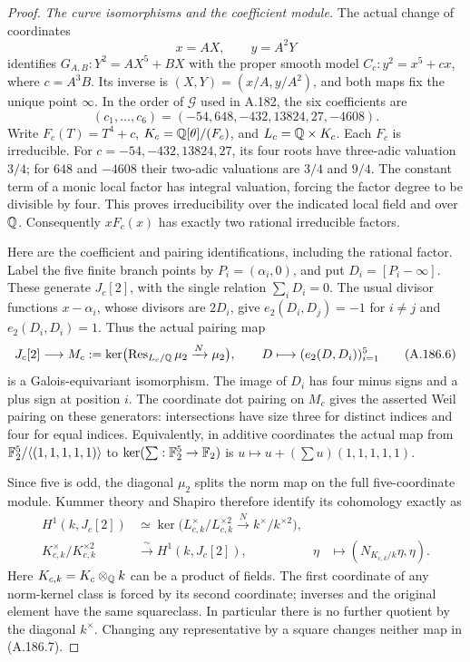 \begin{proof}
\emph{The curve isomorphisms and the coefficient module.}
The actual change of coordinates
\[
 x=AX,\qquad y=A^2Y
\tag{A.186.4}
\]
identifies \(G_{A,B}:Y^2=AX^5+BX\) with the proper smooth model
\(C_c:y^2=x^5+cx\), where \(c=A^3B\).  Its inverse is
\((X,Y)=(x/A,y/A^2)\), and both maps fix the unique point
\(\infty\).  In the order of \(\mathcal G\) used in A.182,
the six coefficients are
\[
                (c_1,\ldots,c_6)
                =(-54,648,-432,13824,27,-4608).
\tag{A.186.5}
\]
Write \(F_c(T)=T^4+c\), \(K_c=\mathbb Q[\theta]/(F_c)\), and
\(L_c=\mathbb Q\times K_c\).  Each \(F_c\) is irreducible.
For \(c=-54,-432,13824,27\), its four roots have
three-adic valuation \(3/4\); for \(648\) and \(-4608\)
their two-adic valuations are \(3/4\) and \(9/4\).
The constant term of a monic local factor has integral valuation,
forcing the factor degree to be divisible by four.  This proves
irreducibility over the indicated local field and over \(\mathbb Q\).
Consequently \(xF_c(x)\) has exactly two rational irreducible
factors.

Here are the coefficient and pairing identifications, including
the rational factor.  Label the five finite branch points by
\(P_i=(\alpha_i,0)\), and put \(D_i=[P_i-\infty]\).
These generate \(J_c[2]\), with the single relation
\(\sum_iD_i=0\).  The usual divisor functions
\(x-\alpha_i\), whose divisors are \(2D_i\), give
\(e_2(D_i,D_j)=-1\) for \(i\ne j\) and
\(e_2(D_i,D_i)=1\).  Thus the actual pairing map
\[
 J_c[2]\longrightarrow
 M_c:=\ker\bigl(\operatorname{Res}_{L_c/\mathbb Q}\mu_2
                         \xrightarrow{N}\mu_2\bigr),
 \qquad D\longmapsto(e_2(D,D_i))_{i=1}^5
\tag{A.186.6}
\]
is a Galois-equivariant isomorphism.  The image of \(D_i\)
has four minus signs and a plus sign at position \(i\).
The coordinate dot pairing on \(M_c\) gives the asserted
Weil pairing on these generators: intersections have size
three for distinct indices and four for equal indices.
Equivalently, in additive coordinates the actual map from
\(\mathbb F_2^5/\langle(1,1,1,1,1)\rangle\) to
\(\ker(\sum:\mathbb F_2^5\to\mathbb F_2)\) is
\(u\mapsto u+(\sum u)(1,1,1,1,1)\).

Since five is odd, the diagonal \(\mu_2\) splits the norm
map on the full five-coordinate module.  Kummer theory and
Shapiro therefore identify its cohomology exactly as
\[
\begin{aligned}
 H^1(k,J_c[2])
 &\simeq\ker\bigl(L_{c,k}^{\times}/L_{c,k}^{\times2}
                    \xrightarrow{N}k^\times/k^{\times2}\bigr),\\
 K_{c,k}^{\times}/K_{c,k}^{\times2}
 &\xrightarrow{\ \sim\ }H^1(k,J_c[2]),
 &\eta&\longmapsto(N_{K_{c,k}/k}\eta,\eta).
\end{aligned}
\tag{A.186.7}
\]
Here \(K_{c,k}=K_c\otimes_\mathbb Q k\) can be a product of
fields.  The first coordinate of any norm-kernel class is
forced by its second coordinate; inverses and the original
element have the same squareclass.  In particular there is
no further quotient by the diagonal \(k^\times\).
Changing any representative by a square changes neither map
in (A.186.7).


\end{proof}
